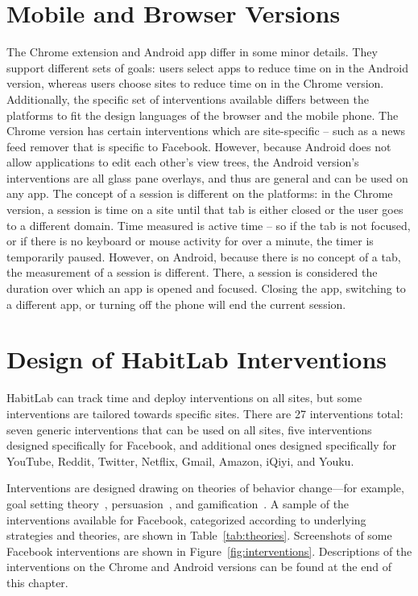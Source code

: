 \section{Mobile and Browser Versions}

The Chrome extension and Android app differ in some minor details. They support different sets of goals: users select apps to reduce time on in the Android version, whereas users choose sites to reduce time on in the Chrome version. Additionally, the specific set of interventions available differs between the platforms to fit the design languages of the browser and the mobile phone. The Chrome version has certain interventions which are site-specific -- such as a news feed remover that is specific to Facebook. However, because Android does not allow applications to edit each other's view trees, the Android version's interventions are all glass pane overlays, and thus are general and can be used on any app. The concept of a session is different on the platforms: in the Chrome version, a session is time on a site until that tab is either closed or the user goes to a different domain. Time measured is active time -- so if the tab is not focused, or if there is no keyboard or mouse activity for over a minute, the timer is temporarily paused. However, on Android, because there is no concept of a tab, the measurement of a session is different. There, a session is considered the duration over which an app is opened and focused. Closing the app, switching to a different app, or turning off the phone will end the current session.

\section{Design of HabitLab Interventions}

HabitLab can track time and deploy interventions on all sites, but some interventions are tailored towards specific sites. There are 27 interventions total: seven generic interventions that can be used on all sites, five interventions designed specifically for Facebook, and additional ones designed specifically for YouTube, Reddit, Twitter, Netflix, Gmail, Amazon, iQiyi, and Youku.

Interventions are designed drawing on theories of behavior change---for example, goal setting theory~\cite{locke2002building}, persuasion~\cite{cialdini1987influence,fogg2002persuasive,abraham2008taxonomy}, and gamification~\cite{deterding2011game}. A sample of the interventions available for Facebook, categorized according to underlying strategies and theories, are shown in Table~\ref{tab:theories}. Screenshots of some Facebook interventions are shown in Figure~\ref{fig:interventions}.  Descriptions of the interventions on the Chrome and Android versions can be found at the end of this chapter. %

